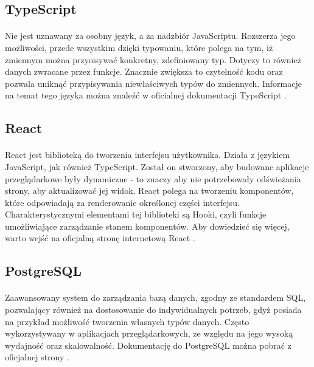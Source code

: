 \subsection{TypeScript}
\paragraph{}
Nie jest uznawany za osobny język, a za nadzbiór JavaScriptu. Rozszerza jego możliwości, przede wszystkim dzięki typowaniu, które polega na tym, iż zmiennym można przyoisywać konkretny, zdefiniowany typ. Dotyczy to również danych zwracane przez funkcje. Znacznie zwiększa to czytelność kodu oraz pozwala uniknąć przypisywania niewłaściwych typów do zmiennych. Informacje na temat tego języka można znaleźć w oficialnej dokumentacji TypeScript \cite{bib:typescript}.

\subsection{React}
\paragraph{}
React jest biblioteką do tworzenia interfejsu użytkownika. Działa z językiem JavaScript, jak również TypeScript. Został on stworzony, aby budowane aplikacje przeglądarkowe były dynamiczne - to znaczy aby nie potrzebowały odświeżania strony, aby aktualizować jej widok. React polega na tworzeniu komponentów, które odpowiadają za renderowanie określonej części interfejsu. Charakterystycznymi elementami tej biblioteki są Hooki, czyli funkcje umożliwiające zarządzanie stanem komponentów. Aby dowiedzieć się więcej, warto wejść na oficjalną stronę internetową React \cite{bib:react}.

\subsection{PostgreSQL}
\paragraph{}
Zaawansowany system do zarządzania bazą danych, zgodny ze standardem SQL, pozwalający również na dostosowanie do indywidualnych potrzeb, gdyż posiada na przykład możliwość tworzenia własnych typów danych. Często wykorzystywany w aplikacjach przeglądarkowych, ze względu na jego wysoką wydajność oraz skalowalność. Dokumentację do PostgreSQL można pobrać z oficjalnej strony \cite{bib:postgres}.

